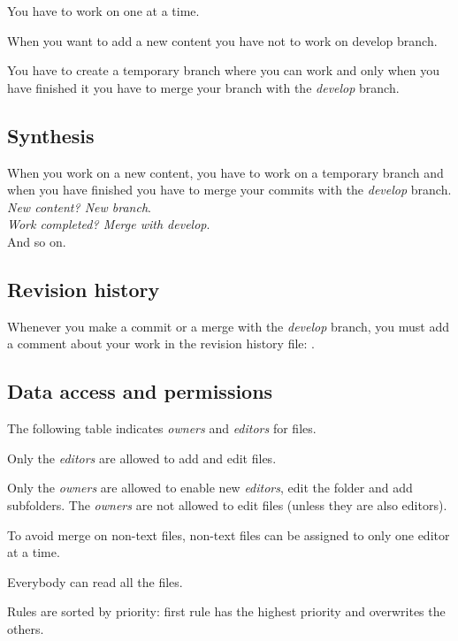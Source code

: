 \documentclass[12pt]{article}
\begin{document}
You have to work on one at a time.

When you want to add a new content you have not to work on develop branch.

You have to create a temporary branch where you can work and only when you have finished it you have to merge your branch with the \textit{develop} branch.


\subsection*{Synthesis}
When you work on a new content, you have to work on a temporary branch and when you have finished you have to merge your commits with the \textit{develop} branch.\\
\textit{New content? New branch}.\\
\textit{Work completed? Merge with develop}.\\
And so on.

\subsection*{Revision history}
Whenever you make a commit or a merge with the \textit{develop} branch, you must add a comment about your work in the revision history file: .

\subsection{Data access and permissions}
The following table indicates \textit{owners} and \textit{editors} for files.

Only the \textit{editors} are allowed to add and edit files.

Only the \textit{owners} are allowed to enable new \textit{editors}, edit the folder and add subfolders. The \textit{owners} are not allowed to edit files (unless they are also editors).

To avoid merge on non-text files, non-text files can be assigned to only one editor at a time.

Everybody can read all the files.

Rules are sorted by priority: first rule has the highest priority and overwrites the others.
\end{document}
